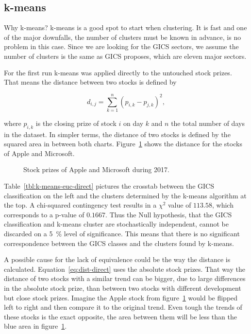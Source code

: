 
\subsection{k-means}\label{sec:k-means}


Why k-means? k-means is a good spot to start when clustering. It is fast and one of the major downfalls, the number of clusters must be known in advance, is no problem in this case. Since we are looking for the GICS sectors, we assume the number of clusters is the same as GICS proposes, which are eleven major sectors\cite{lloyd1982least}.

For the first run k-means was applied directly to the untouched stock prizes. That means the distance between two stocks is defined by

\begin{equation}\label{eq:dist-direct}
d_{i,j} = \sum^{n}_{k = 1} {(p_{i,k} - p_{j,k})^2},
\end{equation}

where $p_{i,k}$ is the closing prize of stock $i$ on day $k$ and $n$ the total number of days in the dataset. In simpler terms, the distance of two stocks is defined by the squared area in between both charts. Figure~\ref{fig:appl-vs-msft} shows the distance for the stocks of Apple and Microsoft.

\begin{figure}\label{fig:appl-vs-msft}
	\centering
	
	\caption{Stock prizes of Apple and Microsoft during 2017.}
\end{figure}



Table~\ref{tbl:k-means-euc-direct} pictures the crosstab between the GICS classification on the left and the clusters determined by the k-means algorithm at the top. A chi-squared contingency test results in a $\chi^2$ value of $113.58$, which corresponds to a p-value of $0.1667$. Thus the Null hypothesis, that the GICS classification and k-means cluster are stochastically independent, cannot be discarded on a 5~\% level of significance. This means that there is no significant correspondence between the GICS classes and the clusters found by k-means.

A possible cause for the lack of equivalence could be the way the distance is calculated. Equation~\ref{eq:dist-direct} uses the absolute stock prizes. That way the distance of two stocks with a similar trend can be bigger, due to large differences in the absolute stock prize, than between two stocks with different development but close stock prizes. Imagine the Apple stock from figure~\ref{fig:appl-vs-msft} would be flipped left to right and then compare it to the original trend. Even tough the trends of these stocks is the exact opposite, the area between them will be less than the blue area in figure~\ref{fig:appl-vs-msft}.

